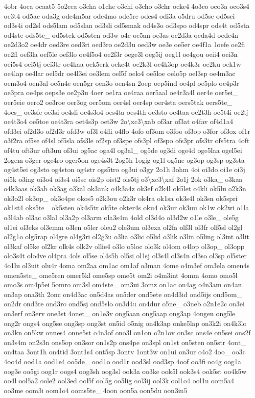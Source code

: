 \begin{DoxyCompactItemize}
4obr 4oca ocaat5 5o2cea o3cha o1che o3chi o3cho o3chr ocke4 4o3co oco3a oco3s4 oc3t4 od5ac oda3g ode4m5ar ode4mo ode5re odes4 odi3a o5dru od5sc od5sei od3s4i od2sl ods5lam od5slan od3sli od5smak od4s3o od3spo od4spr ods4t od5sta od4ste ods5te\-\_\- od5stek od5sten od3w o4e oe5an oe3as oe2d3a oeda4d oede4n oe2d3o2 oe4dr oed3re oed3ri oed3ro oe2d3u oed3w oe3e oe5er oe4f1a 1oefe oe2fi oe2fl oef3la oef5le oef3lo oe4f5o4 oe2f3r oege3l oeg5ij oeg1l oe4gou oeii4 oei3n oei5s4 oei5tj oei3tr oe4kaa oek5erk oeke4t oe2k3l oe4k3op oe4k3r oe2ku oek1w oe4lap oe4lar oel5dr oe4l3ei oe3lem oel5f oelo4 oe5loe oelo5p oel3sp oe4m3ac oem3o4 oen3al oe5n4e oen5gr oen3o oen4sn 2oep oep5ind oe4pl oe5plo oe4p3r oe3pra oe4ps oeps3e oe2p3u 4oer oe1ra oe4raa oer5aal oe4r3a4l oer4e oer5ei\-\_\- oer5eie oero2 oe3roe oer3og oer5om oer4sl oer4sp oer4sta oers5tak oers5te\-\_\- 4oes\-\_\- oe3sfe oe3si oe4sli oe4s3o4 oes4ta oes4th oe3sto oe4taa oe2t3h oe5t4i oe2tj oe4t3o4 oe5toe oe4t3ra oet4s3p oet3w 2o\textbackslash{}xc3\textbackslash{}xab of3ar of3at o4fav of4d1a4 ofd3ei of2d3o of2d3r ofd3w of3l o4fli o4flo 4ofo of3om o3foo of3op o3for of3ox of1r o3f2ra of5se of4sl of5sla ofs3le of2sp of3spe ofs3pl of3spo ofs3pr ofs3tr ofs5tra 4oft of4tu oft3ur oft3uu of3ui og5ac oga4l og3al\-\_\- og5de og3di oge4d oge5laa ogel5ei 2ogem o3ger oge4ro oger5on oge4s3t 2og5h 1ogig og1l og5ne og3op og3sp og3sta og4st5ei og3sto og4ston og4str ogs5tro og3ui o3gy 2o1h 3ohm 4oi oi3do oi1e oi3j oi5k o3ing oi3o4 oi3s4 oi5sc ois2p oist2 ois5tj o3\textbackslash{}xc3\textbackslash{}xaf 2o1j 2ok o3ka\-\_\- o3kaa o4k3aas ok3ab ok3ag o3kal ok3ank o4k3a4z ok3ef o2k4l ok5let o4kli ok5lu o2k3n ok3o2l ok3op\-\_\- ok3o4pe okos5 o2k3ou o2k3r ok4ra ok1sa ok3s4l ok3sn ok5spri ok1st4 oks5te\-\_\- ok5sten ok4s5tr ok5te okter4s oku4 ok3ur ok3uu ok1w ok2wi o1la o3l4ab ol3ac o3lal ol3a2p ol3arm ola3s4m 4old ol3d4o ol3d2w o1le o3le\-\_\- ole5g ol1ei ol3eks ol3emm o3len o5ler oleu2 ole3um ol3exa ol2fa olf3l ol3fr olf5sl ol2gl ol2g1o olg5rap ol4gre ol4g3ri ol2g3u o3lia o3lic o5lid o3lik o3lin o5ling ol3int o3lit ol3kaf ol5ke ol2kr olk4s olk2v ollie4 o3lo o5loc olo3k ol4om o4lop ol3op\-\_\- ol3opp olo3s4t olo4ve ol4pra 4ols ol5se ol4s5h ol5si ol1sj ol3s4l ol3s4n ol3so ol3sp ol5ster 4o1lu ol3uit olu4r 4oma om2aa om1ac om1af o3man 4ome o4m3ef om3ela omen4s omen5ste\-\_\- ome5ren omer5kl ome5sp ome5t om2i o4m3int 4omm 4omo omo5l omo3s om4p5ei 5omro om3sl om4ste\-\_\- om3ui 3omz on1ac on4ag o4n3am on4an on3ap ona3th 2onc on4d3ac on5d4as on5der ond5ete on4d3id ond5ijs ond5om\-\_\- on2dr ond3re ond3ro ond5sj ond5slo on3d4u on4dur o5ne\-\_\- o3neb o2n1e2c on3ei on3erf on3erv one3st 4onet\-\_\- on1e3v ong5aan ong5aap ong3ap 4ongen ong5le ong2r ongs4 ong5se ong3sp ong3st on5id o5nig on4k3ap onke5lap on3k2i on4k3lo on3kn on5kw onnes4 onne5st o4n3of ono3l on1on o2n1ov on3sc ons4e on5sei ons2f on3s4m on2s3n ons5op on3sor on1s2p ons4pe on3spl on1st on5sten on5str 4ont\-\_\- on4taa 3ont1h on4tid 3ont1s4 ont5sp 3ontv 1ont3w on1ui on3ur o4o2 4oo\-\_\- oo3c 4oo4d ood1a ood1e4 oo5de\-\_\- ood1o ood1r ood3sl ood3sp 4oof oo3fi oo4g oog1a oog3e oo5gi oog1r oogs4 oog3sh oog3sl ook3a oo3ke ook5l ook3s4 ook5st oo4k5w oo4l ool5a2 oole2 ool3ed ool5f ool5g oo5lig ool3ij ool3k ool1o4 ool1u oom5a4 oo3me oom3i oom1o4 ooms5te\-\_\- 4oon oon5a oon5du oon3in5 
\end{DoxyCompactItemize}
